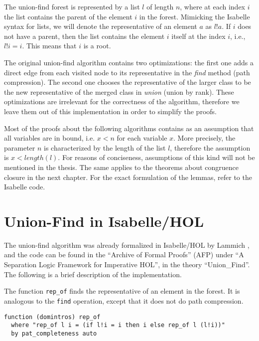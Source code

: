 The union-find forest is represented by a list $l$ of length $n$, where at each index $i$ the list contains the parent of the element $i$ in the forest.
Mimicking the Isabelle syntax for lists, we will denote the representative of an element $a$ as $l ! a$.
If $i$ does not have a parent, then the list contains the element $i$ itself at the index $i$, i.e., $l!i = i$. This means that $i$ is a root.

The original union-find algorithm \cite{Tarjan} contains two optimizations: the first one adds a direct edge from each visited node to its representative in the \emph{find} method (path compression). The second one chooses the representative of the larger class to be the new representative of the merged class in \emph{union} (union by rank). These optimizations are irrelevant for the correctness of the algorithm, therefore we leave them out of this implementation in order to simplify the proofs.

Most of the proofs about the following algorithms contains as an assumption that all variables are in bound, i.e. $x < n$ for each variable $x$.
More precisely, the parameter $n$ is characterized by the length of the list $l$, therefore the assumption is $x < length(l)$.
For reasons of conciseness, assumptions of this kind will not be mentioned in the thesis. The same applies to the theorems about congruence closure in the next chapter.
For the exact formulation of the lemmas, refer to the Isabelle code.

\section{Union-Find in Isabelle/HOL}
\label{section:uf-isabelle}

The union-find algorithm was already formalized in Isabelle/HOL by Lammich \cite{unionfind-isabelle}, and the code can be found in the ``Archive of Formal Proofs'' (AFP) under ``A Separation Logic Framework for Imperative HOL'', in the theory ``Union\_Find''\cite{afp, Sep}. The following is a brief description of the implementation.

The function \lstinline{rep_of} finds the representative of an element in the forest. It is analogous to the \lstinline{find} operation, except that it does not do path compression.

\begin{lstlisting}
function (domintros) rep_of
  where "rep_of l i = (if l!i = i then i else rep_of l (l!i))"
  by pat_completeness auto
\end{lstlisting}

